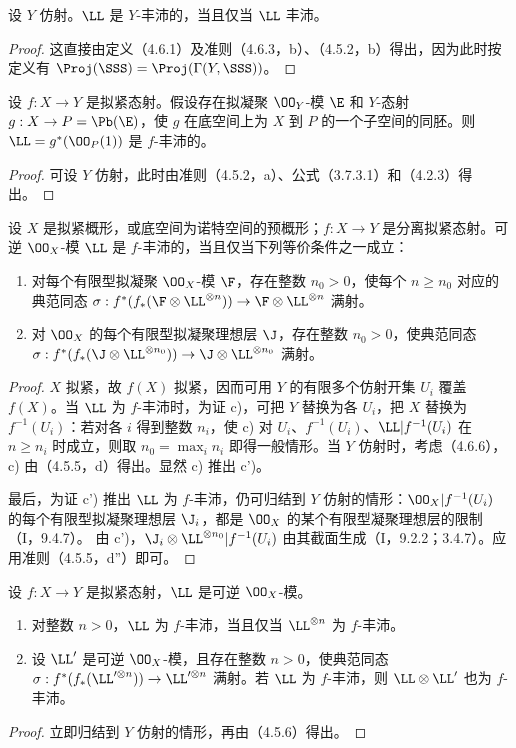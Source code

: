 设 $Y$ 仿射。$\LL$ 是 $Y$-丰沛的，当且仅当 $\LL$ 丰沛。
\begin{proof}
这直接由定义（4.6.1）及准则（4.6.3，b）、（4.5.2，b）得出，因为此时按定义有
$\Proj(\SSS)=\Proj(\Gamma(Y,\SSS))$。
\end{proof}

设 $f:X\to Y$ 是拟紧态射。假设存在拟凝聚 $\OO_Y$-模 $\E$ 和 $Y$-态射 $g:X\to P=\Pb(\E)$，使 $g$ 在底空间上为 $X$ 到 $P$ 的一个子空间的同胚。则 $\LL=g^*(\OO_P(1))$ 是 $f$-丰沛的。
\begin{proof}
可设 $Y$ 仿射，此时由准则（4.5.2，a）、公式（3.7.3.1）和（4.2.3）得出。
\end{proof}

设 $X$ 是拟紧概形，或底空间为诺特空间的预概形；$f:X\to Y$ 是分离拟紧态射。可逆 $\OO_X$-模 $\LL$ 是 $f$-丰沛的，当且仅当下列等价条件之一成立：
\begin{enumerate}[label=\textup{c)}]
\item 对每个有限型拟凝聚 $\OO_X$-模 $\F$，存在整数 $n_0>0$，使每个 $n\geq n_0$ 对应的典范同态
$\sigma:f^*(f_*(\F\otimes\LL^{\otimes n}))\to\F\otimes\LL^{\otimes n}$ 满射。
\item[\textup{c')}] 对 $\OO_X$ 的每个有限型拟凝聚理想层 $\J$，存在整数 $n_0>0$，使典范同态
$\sigma:f^*(f_*(\J\otimes\LL^{\otimes n_0}))\to\J\otimes\LL^{\otimes n_0}$ 满射。
\end{enumerate}
\begin{proof}
$X$ 拟紧，故 $f(X)$ 拟紧，因而可用 $Y$ 的有限多个仿射开集 $U_i$ 覆盖 $f(X)$。当 $\LL$ 为 $f$-丰沛时，为证 c)，可把 $Y$ 替换为各 $U_i$，把 $X$ 替换为 $f^{-1}(U_i)$：若对各 $i$ 得到整数 $n_i$，使 c) 对 $U_i$、$f^{-1}(U_i)$、$\LL|f^{-1}(U_i)$ 在 $n\geq n_i$ 时成立，则取 $n_0=\max_i n_i$ 即得一般情形。当 $Y$ 仿射时，考虑（4.6.6），c) 由（4.5.5，d）得出。显然 c) 推出 c')。

最后，为证 c') 推出 $\LL$ 为 $f$-丰沛，仍可归结到 $Y$ 仿射的情形：$\OO_X|f^{-1}(U_i)$ 的每个有限型拟凝聚理想层 $\J_i$，都是 $\OO_X$ 的某个有限型凝聚理想层的限制（I，9.4.7）。
由 c')，$\J_i\otimes\LL^{\otimes n_0}|f^{-1}(U_i)$ 由其截面生成（I，9.2.2；3.4.7）。应用准则（4.5.5，d''）即可。
\end{proof}

设 $f:X\to Y$ 是拟紧态射，$\LL$ 是可逆 $\OO_X$-模。
\begin{enumerate}[label=\textup{(\roman*)}]
\item 对整数 $n>0$，$\LL$ 为 $f$-丰沛，当且仅当 $\LL^{\otimes n}$ 为 $f$-丰沛。
\item 设 $\LL'$ 是可逆 $\OO_X$-模，且存在整数 $n>0$，使典范同态
$\sigma:f^*(f_*(\LL'^{\otimes n}))\to\LL'^{\otimes n}$ 满射。若 $\LL$ 为 $f$-丰沛，则 $\LL\otimes\LL'$ 也为 $f$-丰沛。
\end{enumerate}
\begin{proof}
立即归结到 $Y$ 仿射的情形，再由（4.5.6）得出。
\end{proof}


